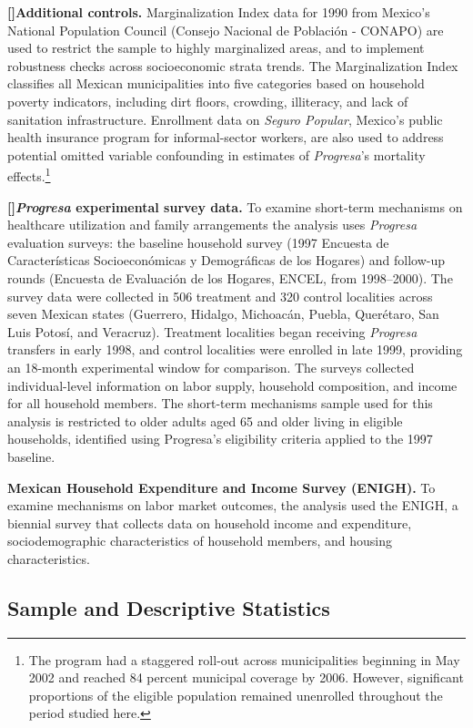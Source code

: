 \documentclass[12pt]{article}
\newcounter{paragraphnum}
\newcommand{\p}{\refstepcounter{paragraphnum}\textbf{[\theparagraphnum]}\enspace}
\begin{document}
\p \textbf{Additional controls.} Marginalization Index data for 1990 from Mexico's National Population Council (Consejo Nacional de Población - CONAPO) are used to restrict the sample to highly marginalized areas, and to implement robustness checks across socioeconomic strata trends. The Marginalization Index classifies all Mexican municipalities into five categories based on household poverty indicators, including dirt floors, crowding, illiteracy, and lack of sanitation  
infrastructure. Enrollment data on \textit{Seguro Popular}, Mexico's public health insurance program for informal-sector workers, are also used to address potential omitted variable confounding in estimates of \textit{Progresa}'s mortality effects.\footnote{The program had a staggered roll-out across municipalities beginning in May 2002 and reached 84 percent municipal coverage by 2006. However, significant proportions of the eligible population remained unenrolled throughout the period studied here.}

\p \textbf{\textit{Progresa} experimental survey data.} To examine short-term mechanisms on healthcare utilization and family arrangements the analysis uses \textit{Progresa} evaluation surveys: the baseline household survey (1997 Encuesta de Características Socioeconómicas y Demográficas de los Hogares) and follow-up rounds (Encuesta de Evaluación de los Hogares, ENCEL, from 1998--2000). The survey data were collected in 506 treatment and 320 control localities across seven Mexican states (Guerrero, Hidalgo, Michoacán, Puebla, Querétaro, San Luis Potosí, and Veracruz). Treatment localities began receiving \textit{Progresa} transfers in early 1998, and control localities were enrolled in late 1999, providing an 18-month experimental window for comparison. The surveys collected individual-level information on labor supply, household composition, and income for all household members. The short-term mechanisms sample used for this analysis is restricted to older adults aged 65 and older living in eligible households, identified using Progresa's eligibility criteria applied to the 1997 baseline. 

\textbf{Mexican Household Expenditure and Income Survey (ENIGH).} To examine mechanisms on labor market outcomes, the analysis used the ENIGH, a biennial survey that collects data on household income and expenditure, sociodemographic characteristics of household members, and housing characteristics.

\subsection{Sample and Descriptive Statistics}\label{s:sample}
\end{document}
